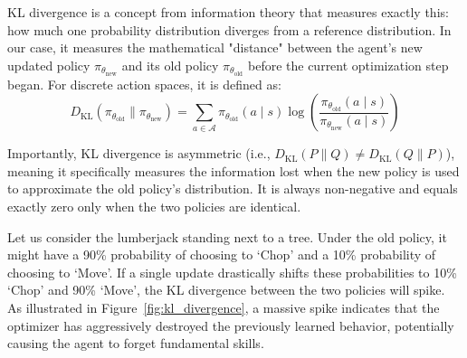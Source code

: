 KL divergence is a concept from information theory that measures exactly this: how much one probability distribution diverges from a reference distribution. In our case, it measures the mathematical "distance" between the agent's new updated policy $\pi_{\theta_{\text{new}}}$ and its old policy $\pi_{\theta_{\text{old}}}$ before the current optimization step began. For discrete action spaces, it is defined as:
\begin{equation}
\label{eq:kl_div}
    D_{\text{KL}}(\pi_{\theta_{\text{old}}} \parallel \pi_{\theta_{\text{new}}}) = \sum_{a \in \mathcal{A}} \pi_{\theta_{\text{old}}}(a \mid s) \log\left(\frac{\pi_{\theta_{\text{old}}}(a \mid s)}{\pi_{\theta_{\text{new}}}(a \mid s)}\right)
\end{equation}

Importantly, KL divergence is asymmetric (i.e., $D_{\text{KL}}(P \parallel Q) \neq D_{\text{KL}}(Q \parallel P)$), meaning it specifically measures the information lost when the new policy is used to approximate the old policy's distribution. It is always non-negative and equals exactly zero only when the two policies are identical.

Let us consider the lumberjack standing next to a tree. Under the old policy, it might have a 90\% probability of choosing to `Chop' and a 10\% probability of choosing to `Move'. If a single update drastically shifts these probabilities to 10\% `Chop' and 90\% `Move', the KL divergence between the two policies will spike. As illustrated in Figure~\ref{fig:kl_divergence}, a massive spike indicates that the optimizer has aggressively destroyed the previously learned behavior, potentially causing the agent to forget fundamental skills.

